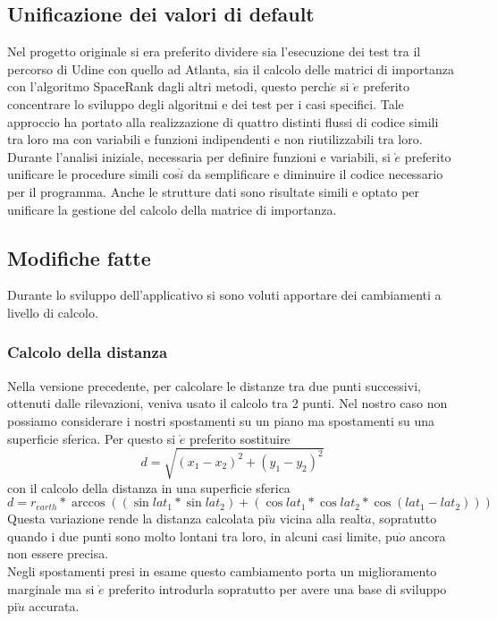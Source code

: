 \subsection{Unificazione dei valori di default}
Nel progetto originale si era preferito dividere sia l'esecuzione dei test tra il percorso di Udine con quello ad Atlanta,
sia il calcolo delle matrici di importanza con l'algoritmo SpaceRank dagli altri metodi, questo perch$\grave{e}$ si $\grave{e}$ preferito
concentrare lo sviluppo degli algoritmi e dei test per i casi specifici.
Tale approccio ha portato alla realizzazione di quattro distinti flussi di codice simili tra loro ma con variabili e funzioni
indipendenti e non riutilizzabili tra loro.\\
Durante l'analisi iniziale, necessaria per definire funzioni e variabili, si $\grave{e}$ preferito unificare le procedure simili cos$\grave{i}$ da
semplificare e diminuire il codice necessario per il programma. Anche le strutture dati sono risultate simili e optato per
unificare la gestione del calcolo della matrice di importanza.\\

\subsection{Modifiche fatte}
Durante lo sviluppo dell'applicativo si sono voluti apportare dei cambiamenti
a livello di calcolo.
\subsubsection{Calcolo della distanza}
Nella versione precedente, per calcolare le distanze tra due punti successivi,
ottenuti dalle rilevazioni, veniva usato il calcolo tra 2 punti. Nel nostro caso
non possiamo considerare i nostri spostamenti su un piano ma spostamenti su una
superficie sferica. Per questo si $\grave{e}$ preferito sostituire
\begin{equation}
d =  \sqrt{(x_{1}-x_{2})^2 + (y_{1}-y_{2})^2}
\end{equation}
con il calcolo della distanza in una superficie sferica
\begin{equation}
d = r_{earth} * \arccos{( (\sin{lat_{1}} * \sin{lat_{2}}) + (\cos{lat_{1}} * \cos{lat_{2}} * \cos{(lat_{1} - lat_{2})} ) )}
\end{equation}
Questa variazione rende la distanza calcolata pi$\grave{u}$ vicina alla realt$\grave{a}$, sopratutto
quando i due punti sono molto lontani tra loro, in alcuni casi limite, pu$\grave{o}$ ancora non essere precisa.\\
Negli spostamenti presi in esame questo cambiamento porta un miglioramento marginale ma si $\grave{e}$ preferito
introdurla sopratutto per avere una base di sviluppo pi$\grave{u}$ accurata.

